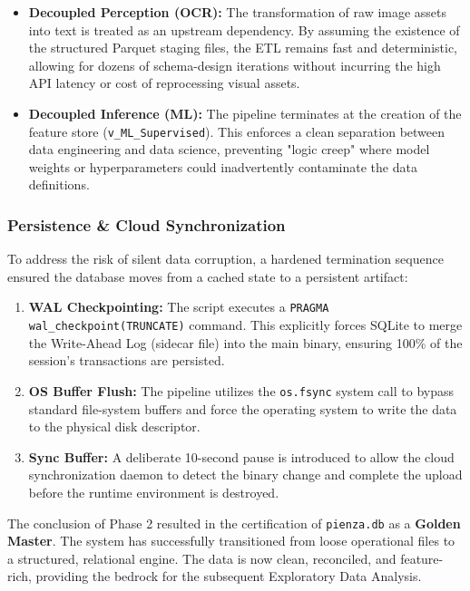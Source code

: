 \begin{itemize}[noitemsep, topsep=3pt]
    \item \textbf{Decoupled Perception (OCR):} The transformation of raw image assets into text is treated as an upstream dependency. By assuming the existence of the structured Parquet staging files, the ETL remains fast and deterministic, allowing for dozens of schema-design iterations without incurring the high API latency or cost of reprocessing visual assets.
    \item \textbf{Decoupled Inference (ML):} The pipeline terminates at the creation of the feature store (\texttt{v\_ML\_Supervised}). This enforces a clean separation between data engineering and data science, preventing "logic creep" where model weights or hyperparameters could inadvertently contaminate the data definitions.
\end{itemize}

\subsubsection{Persistence \& Cloud Synchronization}
To address the risk of silent data corruption, a hardened termination sequence ensured the database moves from a cached state to a persistent artifact:

\begin{enumerate}[noitemsep]
    \item \textbf{WAL Checkpointing:} The script executes a \texttt{PRAGMA wal\_checkpoint(TRUNCATE)} command. This explicitly forces SQLite to merge the Write-Ahead Log (sidecar file) into the main binary, ensuring 100\% of the session's transactions are persisted.
    \item \textbf{OS Buffer Flush:} The pipeline utilizes the \texttt{os.fsync} system call to bypass standard file-system buffers and force the operating system to write the data to the physical disk descriptor.
    \item \textbf{Sync Buffer:} A deliberate 10-second pause is introduced to allow the cloud synchronization daemon to detect the binary change and complete the upload before the runtime environment is destroyed.
\end{enumerate}

The conclusion of Phase 2 resulted in the certification of \texttt{pienza.db} as a \textbf{Golden Master}. The system has successfully transitioned from loose operational files to a structured, relational engine. The data is now clean, reconciled, and feature-rich, providing the bedrock for the subsequent Exploratory Data Analysis.


